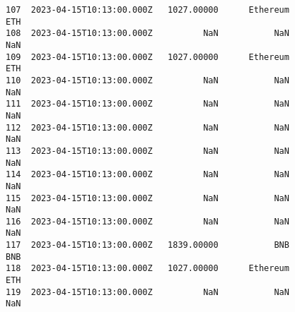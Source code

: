 \documentclass[11pt]{article}
\begin{document}
\begin{tcolorbox}[breakable, size=fbox, boxrule=.5pt, pad at break*=1mm, opacityfill=0]
\begin{Verbatim}[commandchars=\\\{\}]
107  2023-04-15T10:13:00.000Z   1027.00000      Ethereum             ETH
108  2023-04-15T10:13:00.000Z          NaN           NaN             NaN
109  2023-04-15T10:13:00.000Z   1027.00000      Ethereum             ETH
110  2023-04-15T10:13:00.000Z          NaN           NaN             NaN
111  2023-04-15T10:13:00.000Z          NaN           NaN             NaN
112  2023-04-15T10:13:00.000Z          NaN           NaN             NaN
113  2023-04-15T10:13:00.000Z          NaN           NaN             NaN
114  2023-04-15T10:13:00.000Z          NaN           NaN             NaN
115  2023-04-15T10:13:00.000Z          NaN           NaN             NaN
116  2023-04-15T10:13:00.000Z          NaN           NaN             NaN
117  2023-04-15T10:13:00.000Z   1839.00000           BNB             BNB
118  2023-04-15T10:13:00.000Z   1027.00000      Ethereum             ETH
119  2023-04-15T10:13:00.000Z          NaN           NaN             NaN


\end{Verbatim}
\end{tcolorbox}
\end{document}
